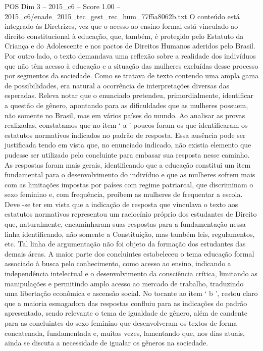 \begin{textsample}{POS Dim 3 – 2015\_c6 – Score 1.00 – 2015\_c6/enade\_2015\_tec\_gest\_rec\_hum\_77f5a8062b.txt}
O conteúdo está integrado às Diretrizes, vez que o acesso ao ensino formal está vinculado ao direito constitucional à educação, que, também, é protegido pelo Estatuto da Criança e do Adolescente e nos pactos de Direitos Humanos aderidos pelo Brasil.
Por outro lado, o texto demandava uma reflexão sobre a realidade dos indivíduos que não têm acesso à educação e a situação das mulheres excluídas desse processo por segmentos da sociedade.
Como se tratava de texto contendo uma ampla gama de possibilidades, era natural a ocorrência de interpretações diversas das esperadas.
Releva notar que o enunciado pretendeu, primordialmente, identificar a questão de gênero, apontando para as dificuldades que as mulheres possuem, não somente no Brasil, mas em vários países do mundo.
Ao analisar as provas realizadas, constatamos que no item ‘ a ’ poucos foram os que identificaram os estatutos normativos indicados no padrão de resposta.
Essa ausência pode ser justificada tendo em vista que, no enunciado indicado, não existia elemento que pudesse ser utilizado pelo concluinte para embasar sua resposta nesse caminho.
As respostas foram mais gerais, identificando que a educação constitui um item fundamental para o desenvolvimento do indivíduo e que as mulheres sofrem mais com as limitações impostas por países com regime patriarcal, que discriminam o sexo feminino e, com frequência, proíbem as mulheres de frequentar a escola.
Deve -se ter em vista que a indicação de resposta que vinculava o texto aos estatutos normativos representou um raciocínio próprio dos estudantes de Direito que, naturalmente, encaminharam suas respostas para a fundamentação nessa linha identificando, não somente a Constituição, mas também leis, regulamentos, etc.
Tal linha de argumentação não foi objeto da formação dos estudantes das demais áreas.
A maior parte dos concluintes estabeleceu o tema educação formal associado à busca pelo conhecimento, como acesso ao ensino, indicando a independência intelectual e o desenvolvimento da consciência crítica, limitando as manipulações e permitindo amplo acesso ao mercado de trabalho, traduzindo uma libertação econômica e ascensão social.
No tocante ao item ‘ b ’, restou claro que a maioria esmagadora das respostas confluiu para as indicações do padrão apresentado, sendo relevante o tema de igualdade de gênero, além de candente para as concluintes do sexo feminino que desenvolveram os textos de forma concatenada, fundamentada e, muitas vezes, lamentando que, nos dias atuais, ainda se discuta a necessidade de igualar os gêneros na sociedade.

\end{textsample}
